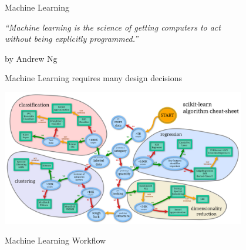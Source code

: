 \begin{frame}[c]{Machine Learning}

\centering
\textit{``Machine learning is the science of getting computers to act\\
 without being explicitly programmed.''}

\hfill by Andrew Ng

\end{frame}
\begin{frame}[c]{Machine Learning requires many design decisions}

\centering
\includegraphics[width=0.8\textwidth]{images/sklearn-cheat}

\end{frame}
\begin{frame}[c]{Machine Learning Workflow}

\centering


\pause
 
\bigskip
\bigskip
{}

\end{frame}
